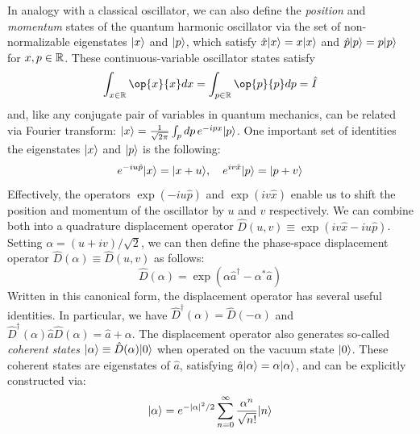 In analogy with a classical oscillator, we can also define the \textit{position} and \textit{momentum} states of the quantum harmonic oscillator via the set of non-normalizable eigenstates $\lvert x\rangle$ and $\lvert p\rangle$, which satisfy $\hat{x}\lvert x\rangle = x\lvert x\rangle$ and $\hat{p}\lvert p\rangle = p\lvert p\rangle$ for $x, p \in \mathbb{R}$. These continuous-variable oscillator states satisfy
\begin{equation}
    \int_{x \in \R} \op{x}{x}dx = \int_{p \in \R} \op{p}{p} dp = \hat{I}
\end{equation}
and, like any conjugate pair of variables in quantum mechanics, can be related via Fourier transform: $\lvert x\rangle = \frac{1}{\sqrt{2\pi}} \int_p dp\, e^{-ipx}\lvert p\rangle$. One important set of identities the eigenstates $\lvert x\rangle$ and $\lvert p\rangle$ is the following: 
\begin{equation}
    e^{-iu\hat{p}}\lvert x\rangle = \lvert x + u\rangle, \quad e^{iv\hat{x}}\lvert p\rangle = \lvert p+v\rangle
\end{equation}
Effectively, the operators $\exp(-iu\hat{p})$ and $\exp(iv\hat{x})$ enable us to shift the position and momentum of the oscillator by $u$ and $v$ respectively. We can combine both into a quadrature displacement operator $\hat{D}(u, v) \equiv \exp(iv\hat{x} - iu\hat{p})$. Setting $\alpha = (u+iv)/\sqrt{2}$, we can then define the phase-space displacement operator $\hat{D}(\alpha) \equiv \hat{D}(u, v)$ as follows: 
\begin{equation}
    \hat{D}(\alpha) = \exp(\alpha\hat{a}^\dagger - \alpha^\ast \hat{a})
\end{equation}
Written in this canonical form, the displacement operator has several useful identities. In particular,  we have $\hat{D}^\dagger(\alpha) = \hat{D}(-\alpha)$ and $\hat{D}^\dagger(\alpha) \hat{a} \hat{D}(\alpha) = \hat{a} + \alpha$. The displacement operator also generates so-called \textit{coherent states} $\lvert\alpha\rangle \equiv \hat{D}(\alpha)\lvert0\rangle$ when operated on the vacuum state $\lvert0\rangle$. These coherent states are eigenstates of $\hat{a}$, satisfying $\hat{a}\lvert\alpha\rangle = \alpha\lvert\alpha\rangle$, and can be explicitly constructed via:
\begin{equation}
    \lvert\alpha\rangle = e^{-|\alpha|^2/2}\sum_{n=0}^\infty \frac{\alpha^n}{\sqrt{n!}} \lvert n\rangle
\end{equation}


